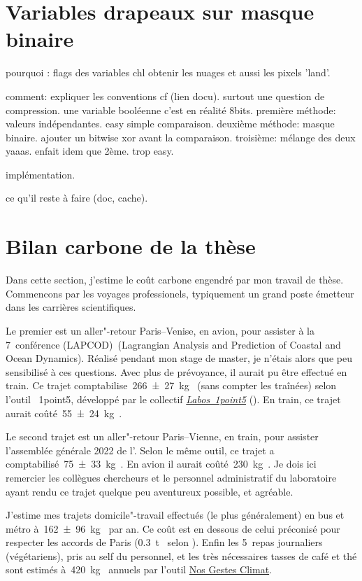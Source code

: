 

\chapter{Variables drapeaux sur masque binaire}
\label{ax:cf-flags}

pourquoi : flags des variables chl
obtenir les nuages et aussi les pixels 'land'.

comment: expliquer les conventions cf (lien docu).
surtout une question de compression. une variable booléenne c'est en réalité 8bits.
première méthode: valeurs indépendantes. easy simple comparaison.
deuxième méthode: masque binaire. ajouter un bitwise xor avant la comparaison.
troisième: mélange des deux yaaas. enfait idem que 2ème. trop easy.

implémentation.

ce qu'il reste à faire (doc, cache).

\chapter{Bilan carbone de la thèse}
\label{ax:bilan-carbone}

Dans cette section, j'estime le coût carbone engendré par mon travail de thèse.
Commencons par les voyages professionels, typiquement un grand poste émetteur dans les carrières scientifiques.

Le premier est un aller"-retour Paris--Venise, en avion, pour assister à la 7\ieme~conférence \abbrv(LAPCOD)~(Lagrangian Analysis and Prediction of Coastal and Ocean Dynamics).
Réalisé pendant mon stage de master, je n'étais alors que peu sensibilisé à ces questions. Avec plus de prévoyance, il aurait pu être effectué en train.
Ce trajet comptabilise~\qty{266 \pm 27}{\kg\carbone} (sans compter les traînées) selon l'outil ~1point5, développé par le collectif \href{https://labos1point5.org/}{\textit{Labos~1point5}} (\cite{mariette_2022}).
En train, ce trajet aurait coûté~\qty{55 \pm 24}{\kg\carbone}.

Le second trajet est un aller"-retour Paris--Vienne, en train, pour assister l'assemblée générale 2022 de l'.
Selon le même outil, ce trajet a comptabilisé~\qty{75 \pm 33}{\kg\carbone}.
En avion il aurait coûté~\qty{230}{\kg\carbone}.
Je dois ici remercier les collègues chercheurs et le personnel administratif du laboratoire ayant rendu ce trajet quelque peu aventureux possible, et agréable.

J'estime  mes trajets domicile"-travail effectués (le plus généralement) en bus et métro à~\qty{162 \pm 96}{\kg\carbone} par an.
Ce coût est en dessous de celui préconisé pour respecter les accords de Paris (\qty{0.3}{\tonne\carbone} selon \textcite{dugast_2019}).
Enfin les 5~repas journaliers (végétariens), pris au self du personnel, et les très nécessaires tasses de café et thé sont estimés à~\qty{420}{\kg\carbone} annuels par l'outil \href{https://nosgestesclimat.fr}{Nos Gestes Climat}.

